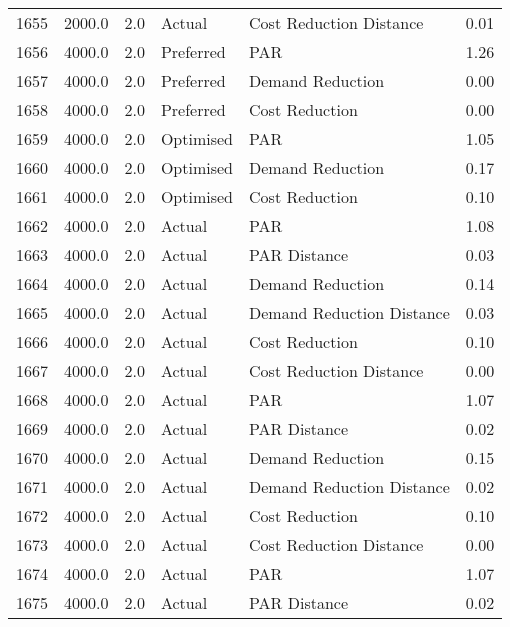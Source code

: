 \begin{longtable}{lrrllr}
1655 &       2000.0 &     2.0 &         Actual &    Cost Reduction Distance &   0.01 \\
1656 &       4000.0 &     2.0 &      Preferred &                        PAR &   1.26 \\
1657 &       4000.0 &     2.0 &      Preferred &           Demand Reduction &   0.00 \\
1658 &       4000.0 &     2.0 &      Preferred &             Cost Reduction &   0.00 \\
1659 &       4000.0 &     2.0 &      Optimised &                        PAR &   1.05 \\
1660 &       4000.0 &     2.0 &      Optimised &           Demand Reduction &   0.17 \\
1661 &       4000.0 &     2.0 &      Optimised &             Cost Reduction &   0.10 \\
1662 &       4000.0 &     2.0 &         Actual &                        PAR &   1.08 \\
1663 &       4000.0 &     2.0 &         Actual &               PAR Distance &   0.03 \\
1664 &       4000.0 &     2.0 &         Actual &           Demand Reduction &   0.14 \\
1665 &       4000.0 &     2.0 &         Actual &  Demand Reduction Distance &   0.03 \\
1666 &       4000.0 &     2.0 &         Actual &             Cost Reduction &   0.10 \\
1667 &       4000.0 &     2.0 &         Actual &    Cost Reduction Distance &   0.00 \\
1668 &       4000.0 &     2.0 &         Actual &                        PAR &   1.07 \\
1669 &       4000.0 &     2.0 &         Actual &               PAR Distance &   0.02 \\
1670 &       4000.0 &     2.0 &         Actual &           Demand Reduction &   0.15 \\
1671 &       4000.0 &     2.0 &         Actual &  Demand Reduction Distance &   0.02 \\
1672 &       4000.0 &     2.0 &         Actual &             Cost Reduction &   0.10 \\
1673 &       4000.0 &     2.0 &         Actual &    Cost Reduction Distance &   0.00 \\
1674 &       4000.0 &     2.0 &         Actual &                        PAR &   1.07 \\
1675 &       4000.0 &     2.0 &         Actual &               PAR Distance &   0.02 \\

\end{longtable}
